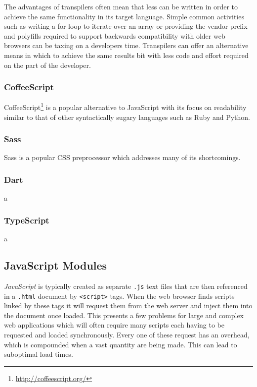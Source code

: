 \documentclass[final]{cmpreport}
\begin{document}
The advantages of transpilers often mean that less can be written in order to achieve the same functionality in its target language. Simple common activities such as writing a for loop to iterate over an array or providing the vendor prefix and polyfills required to support backwards compatibility with older web browsers can be taxing on a developers time. Transpilers can offer an alternative means in which to achieve the same results bit with less code and effort required on the part of the developer.

\subsubsection{CoffeeScript}
CoffeeScript\footnote{\url{http://coffeescript.org/}} is a popular alternative to JavaScript with its focus on readability similar to that of other syntactically sugary \cite{Raymond} languages such as Ruby and Python.

\subsubsection{Sass}
Sass is a popular CSS preprocessor which addresses many of its shortcomings.

\subsubsection{Dart}
a

\subsubsection{TypeScript}
a

\subsection{JavaScript Modules}
\textit{JavaScript} is typically created as separate \texttt{.js} text files that are then referenced in a \texttt{.html} document by \texttt{<script>} tags. When the web browser finds scripts linked by these tags it will request them from the web server and inject them into the document once loaded. This presents a few problems for large and complex web applications which will often require many scripts each having to be requested and loaded synchronously. Every one of these request has an overhead, which is compounded when a vast quantity are being made. This can lead to suboptimal load times.
\end{document}
